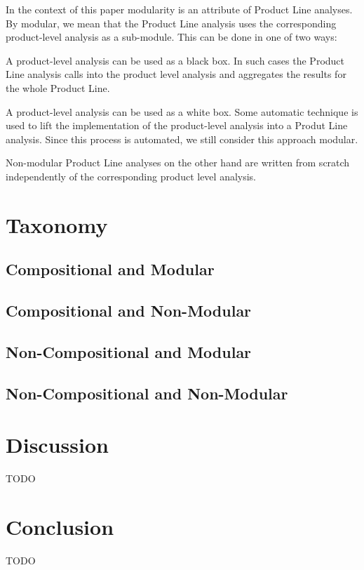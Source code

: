 \documentclass[11pt]{article}
\begin{document}
In the context of this paper modularity is an attribute of Product Line analyses. By modular, we mean that the Product Line analysis uses the corresponding product-level analysis as a sub-module. This can be done in one of two ways:

A product-level analysis can be used as a black box. In such cases the Product Line analysis calls into the product level analysis and aggregates the results for the whole Product Line.

A product-level analysis can be used as a white box. Some automatic technique is used to lift the implementation of the product-level analysis into a Produt Line analysis. Since this process is automated, we still consider this approach modular.

Non-modular Product Line analyses on the other hand are written from scratch independently of the corresponding product level analysis.

\section{Taxonomy}

\subsection{Compositional and Modular}

\subsection{Compositional and Non-Modular}

\subsection{Non-Compositional and Modular}

\subsection{Non-Compositional and Non-Modular}

\section{Discussion}
TODO

\section{Conclusion}
TODO

%
% 
\end{document}
